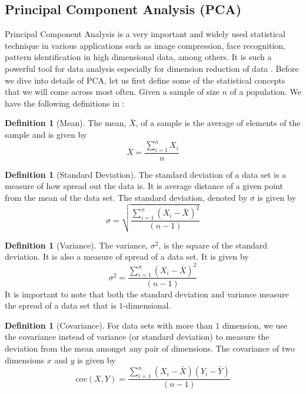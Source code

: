 \documentclass[10pt,a4paper]{article}
\theoremstyle{plain}
\theoremstyle{definition}
\newtheorem{defn}[subsection]{Definition}
\begin{document}
     \subsection{Principal Component Analysis (PCA)}
	  Principal Component Analysis is a very important and widely used statistical technique in various applications such as image compression, face recognition, pattern identification in high dimensional data, among others. It is such a powerful tool for data analysis especially for dimension reduction of data \citep{shlens2014tutorial}. Before we dive into details of PCA, let us first define some of the statistical concepts that we will come across most often. Given a sample of size $n$ of a population. We have the following definitions in \citep{smith2002tutorial} :\\
	  
	  \begin{defn}[Mean]
	  	The mean, $\bar{X}$, of a sample is the average of elements of the sample and is given by
	  	\begin{equation}
	  	\bar{X} = \frac{\sum_{i=1}^{n} X_i}{n}
	  	\end{equation}
	  \end{defn}
    
      \begin{defn}[Standard Deviation]
      	The standard deviation of a data set is a measure of how spread out the data is. It is average distance of a given point from the mean of the data set. The standard deviation, denoted by $\sigma$ is given by
      	\begin{equation}
      	\sigma = \sqrt{\frac{\sum_{i=1}^{n} (X_i - \bar{X})^2}{(n-1)}}
      	\end{equation}
      \end{defn}
  
      \begin{defn}[Variance]
      	The variance, $\sigma^2$, is the square of the standard deviation. It is also a measure of spread of a data set. It is given by
      	\begin{equation}
      	\sigma^2 =  \frac{\sum_{i=1}^{n} (X_i - \bar{X})^2}{(n-1)}
      	\end{equation}
      	It is important to note that both the standard deviation and variance measure the spread of a data set that is $1$-dimensional. \\
      \end{defn}
  
      \begin{defn}[Covariance]
      	For data sets with more than $1$ dimension, we use the covariance instead of variance (or standard deviation) to measure the deviation from the mean amongst any pair of dimensions. The covariance of two dimensions $x$ and $y$ is given by
      	\begin{equation}
      	cov(X,Y) = \frac{\sum_{i=1}^{n} (X_i - \bar{X}) (Y_i - \bar{Y})}{(n-1)}
      	\end{equation}\\
      \end{defn}
  
\end{document}
